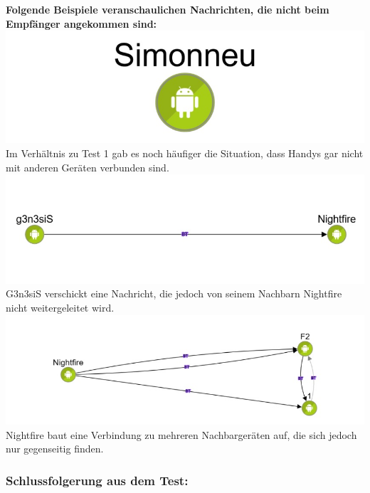 \textbf{Folgende Beispiele veranschaulichen Nachrichten, die nicht beim
Empfänger angekommen sind:}\\
\includegraphics[width=1.0\textwidth]{belege/grosstests/Bilder/Grosstest2/Test2Misserfolg1.jpg}\\
Im Verhältnis zu Test 1 gab es noch häufiger die Situation, dass Handys
gar nicht mit anderen Geräten verbunden sind.\\
\includegraphics[width=1.0\textwidth]{belege/grosstests/Bilder/Grosstest2/Test2Misserfolg2.jpg}\\
G3n3siS verschickt eine Nachricht, die jedoch von seinem Nachbarn
Nightfire nicht weitergeleitet wird.\\
\includegraphics[width=1.0\textwidth]{belege/grosstests/Bilder/Grosstest2/Test2Misserfolg3.jpg}\\
Nightfire baut eine Verbindung zu mehreren Nachbargeräten auf, die sich
jedoch nur gegenseitig finden.\\

\subsubsection{Schlussfolgerung aus dem
Test:}\label{schlussfolgerung-aus-dem-test-3}


